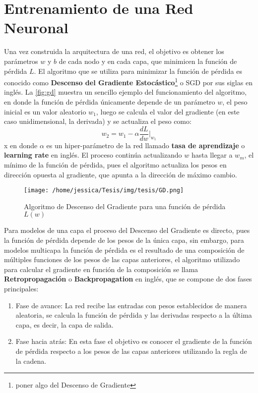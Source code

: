 \section{Entrenamiento de una Red Neuronal}\label{sec:TrainNN}
Una vez construida la arquitectura de una red, el objetivo es obtener los parámetros $w$ y $b$ de cada nodo y en cada capa, que minimicen la función de pérdida $L$. El algoritmo que se utiliza para minimizar la función de pérdida es conocido como \textbf{Descenso del Gradiente Estocástico}\footnote{poner algo del Descenso de Gradiente} o SGD por sus siglas en inglés. La \autoref{fig:gd} muestra un sencillo ejemplo del funcionamiento del algoritmo, en donde la función de pérdida únicamente depende de un parámetro $w$, el peso inicial es un valor aleatorio $w_1$, luego se calcula el valor del gradiente (en este caso unidimensional, la derivada) y se actualiza el peso como:
$$w_2 = w_1 - \alpha \frac{dL}{dw}\bigg|_{w_1}$$x
en donde $\alpha$ es un hiper-parámetro de la red llamado \textbf{tasa de aprendizaje} o \textbf{learning rate} en inglés. El proceso continúa actualizando $w$ hasta llegar a $w_m$, el mínimo de la función de pérdida, pues el algoritmo actualiza los pesos en dirección opuesta al gradiente, que apunta a la dirección de máximo cambio.

\begin{figure}[h]
  \centering
  \texttt{[image: /home/jessica/Tesis/img/tesis/GD.png]}
\caption{Algoritmo de Descenso del Gradiente para una función de pérdida $L(w)$}
\label{fig:gd}
\end{figure}

Para modelos de una capa el proceso del Descenso del Gradiente es directo, pues la función de pérdida depende de los pesos de la
única capa, sin embargo, para modelos multicapa la función de pérdida es el resultado de una composición de múltiples funciones de los pesos de las capas anteriores, el algoritmo utilizado para calcular el gradiente en función de la composición se llama \textbf{Retropropagación} o \textbf{Backpropagation} en inglés, que se compone de dos fases principales:
\begin{enumerate}
\item Fase de avance: La red recibe las entradas con pesos establecidos de manera aleatoria, se calcula la función de pérdida y las derivadas respecto a la última capa, es decir, la capa de salida.
  \item Fase hacia atrás: En esta fase el objetivo es conocer el gradiente de la función de pérdida respecto a los pesos de las capas anteriores utilizando la regla de la cadena.
\end{enumerate}

